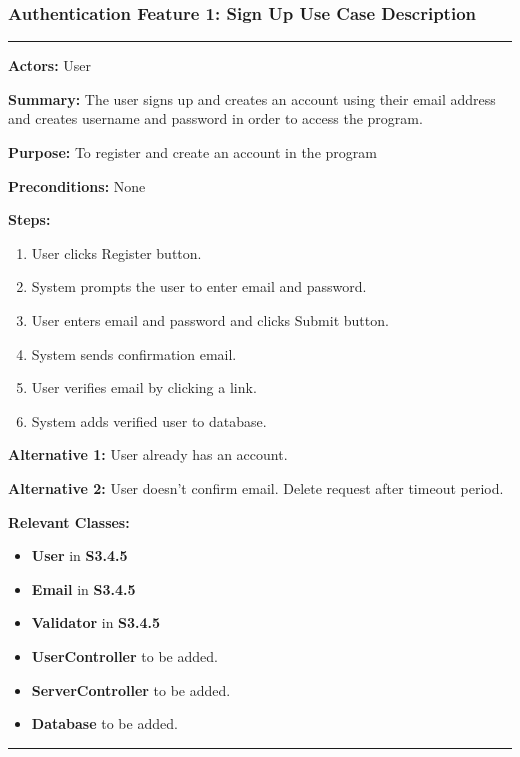 \documentclass[twoside,letterpaper]{article}
\begin{document}
\newpage

\subsubsection[Authentication Feature 1: Sign Up Use Case Description]{\rmfamily\bfseries\color{black}
Authentication Feature 1: Sign Up Use Case Description}
\hypertarget{RefHeading22059017292}{}

\vspace{2pt}
\hrule
\vspace{8pt}
\textbf{Actors:} User \newline

\noindent\textbf{Summary:} The user signs up and creates an account using their email address and creates username and password in order to access the program. \newline

\noindent\textbf{Purpose:} To register and create an account in the program \newline

\noindent\textbf{Preconditions:} None \newline

\noindent\textbf{Steps:} \begin{enumerate}
	\item User clicks Register button.
	\item System prompts the user to enter email and password.
	\item User enters email and password and clicks Submit button.
	\item System sends confirmation email.
	\item User verifies email by clicking a link.
	\item System adds verified user to database.
\end{enumerate}
\noindent\textbf{Alternative 1:} User already has an account. \newline

\noindent\textbf{Alternative 2:} User doesn't confirm email. Delete request after timeout period. \newline

\noindent\textbf{Relevant Classes:}
\begin{itemize}
	\item \textbf{User} in \textbf{S3.4.5}
	\item \textbf{Email} in \textbf{S3.4.5}
	\item \textbf{Validator} in \textbf{S3.4.5}
	\item \textbf{UserController} to be added.
	\item \textbf{ServerController} to be added.
	\item \textbf{Database} to be added.
\end{itemize}
\vspace{8pt}
\hrule
\newpage
\end{document}
